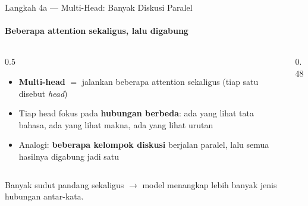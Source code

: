 \documentclass[aspectratio=169,t]{beamer}
\begin{document}
\begin{frame}{Langkah 4a --- Multi-Head: Banyak Diskusi Paralel}
  \framesubtitle{Beberapa attention sekaligus, lalu digabung}
  \begin{columns}[T]
    \begin{column}{0.5\textwidth}
      \footnotesize
      \begin{itemize}
        \item \textbf{Multi-head} $=$ jalankan beberapa attention sekaligus (tiap satu disebut \emph{head})
        \item Tiap head fokus pada \textbf{hubungan berbeda}: ada yang lihat tata bahasa, ada yang lihat makna, ada yang lihat urutan
        \item Analogi: \textbf{beberapa kelompok diskusi} berjalan paralel, lalu semua hasilnya digabung jadi satu
      \end{itemize}
    \end{column}
    \begin{column}{0.48\textwidth}
      \centering
    \end{column}
  \end{columns}
  \vspace{0.3em}
  \begin{center}
    \textcolor{nvlightgreen}{\small Banyak sudut pandang sekaligus $\to$ model menangkap lebih banyak jenis hubungan antar-kata.}
  \end{center}
\end{frame}
\end{document}

